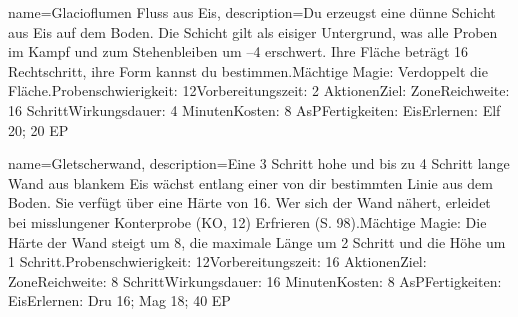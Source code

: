 {
    name={Glacioflumen Fluss aus Eis},
    description={Du erzeugst eine dünne Schicht aus Eis auf dem Boden. Die Schicht gilt als eisiger Untergrund, was alle Proben im Kampf und zum Stehenbleiben um –4 erschwert. Ihre Fläche beträgt 16 Rechtschritt, ihre Form kannst du bestimmen.\newline Mächtige Magie: Verdoppelt die Fläche.\newline Probenschwierigkeit: 12\newline Vorbereitungszeit: 2 Aktionen\newline Ziel: Zone\newline Reichweite: 16 Schritt\newline Wirkungsdauer: 4 Minuten\newline Kosten: 8 AsP\newline Fertigkeiten: Eis\newline Erlernen: Elf 20; 20 EP}
}


{
    name={Gletscherwand},
    description={Eine 3 Schritt hohe und bis zu 4 Schritt lange Wand aus blankem Eis wächst entlang einer von dir bestimmten Linie aus dem Boden. Sie verfügt über eine Härte von 16. Wer sich der Wand nähert, erleidet bei misslungener Konterprobe (KO, 12) Erfrieren (S. 98).\newline Mächtige Magie: Die Härte der Wand steigt um 8, die maximale Länge um 2 Schritt und die Höhe um 1 Schritt.\newline Probenschwierigkeit: 12\newline Vorbereitungszeit: 16 Aktionen\newline Ziel: Zone\newline Reichweite: 8 Schritt\newline Wirkungsdauer: 16 Minuten\newline Kosten: 8 AsP\newline Fertigkeiten: Eis\newline Erlernen: Dru 16; Mag 18; 40 EP}
}


